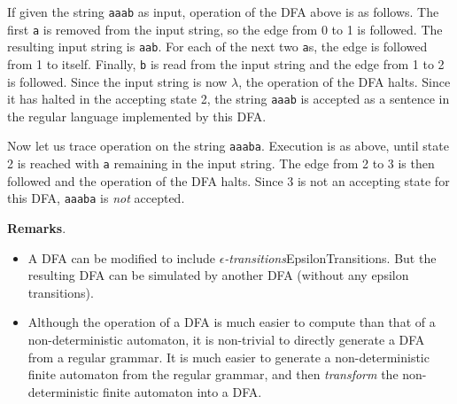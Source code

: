 \documentclass[12pt]{article}
\begin{document}
If given the string \verb=aaab= as input, operation of the DFA above is as follows.  The first \verb=a= is removed from the input string, so the edge from 0 to 1 is followed.  The resulting input string is \verb=aab=.  For each of the next two \verb=a=s, the edge is followed from 1 to itself.  Finally, \verb=b= is read from the input string and the edge from 1 to 2 is followed.  Since the input string is now $\lambda$, the operation of the DFA halts.  Since it has halted in the accepting state 2, the string \verb=aaab= is accepted as a sentence in the regular language implemented by this DFA.

Now let us trace operation on the string \verb=aaaba=.  Execution is as above, until state 2 is reached with \verb=a= remaining in the input string.  The edge from 2 to 3 is then followed and the operation of the DFA halts.  Since 3 is not an accepting state for this DFA, \verb=aaaba= is \emph{not} accepted.

\textbf{Remarks}.
\begin{itemize}
\item 
A DFA can be modified to include \emph{$\epsilon$-transitions}{EpsilonTransitions}.  But the resulting DFA can be simulated by another DFA (without any epsilon transitions).
\item
Although the operation of a DFA is much easier to compute than that of a non-deterministic automaton, it is non-trivial to directly generate a DFA from a regular grammar.  It is much easier to generate a non-deterministic finite automaton from the regular grammar, and then \emph{transform} the non-deterministic finite automaton into a DFA.
\end{itemize}
\end{document}
